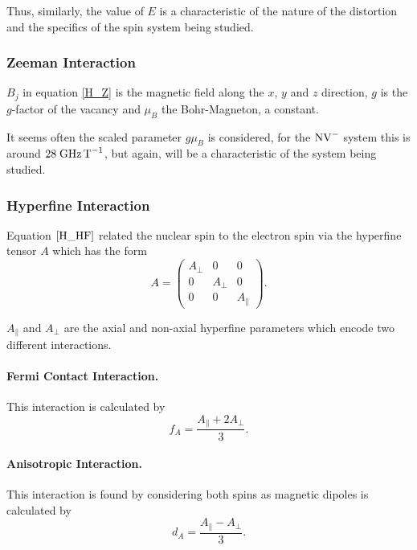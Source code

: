 Thus, similarly, the value of $E$ is a characteristic of the nature of the distortion and 
the specifics of the spin system being studied. 

\subsubsection{Zeeman Interaction}

$B_j$ in equation \ref{H_Z} is the magnetic field along the $x$, $y$ and $z$ direction, $g$ is the $g$-factor of the vacancy and $\mu_B$ the Bohr-Magneton, a constant. 

It seems often the scaled parameter $g\mu_B$ is considered, for the $\ce{NV^-}$ system this is around $28\;\ce{ GHz T^{-1}}$, but again, will be a characteristic of the system being studied. 

\subsubsection{Hyperfine Interaction}

Equation $\ref{H_HF}$ related the nuclear spin to the electron spin via the hyperfine tensor $A$ which has the form 
\begin{equation}
    A = \begin{pmatrix}
        A_\perp & 0 & 0 \\ 
        0 & A_\perp & 0 \\ 
        0 & 0 & A_\parallel
    \end{pmatrix}.
    \label{eq:hyperfine_tensor}
\end{equation}

$A_\parallel$ and $A_\perp$ are the axial and non-axial hyperfine parameters which encode two different interactions. 

\paragraph{Fermi Contact Interaction.}
This interaction is calculated by 
\begin{equation}
    f_A = \frac{A_\parallel + 2 A_\perp}{3}.
    \label{eq:fermi_contact}
\end{equation}

\paragraph{Anisotropic Interaction.}
This interaction is found by considering both spins as magnetic dipoles is calculated by 
\begin{equation}
    d_A = \frac{A_\parallel - A_\perp}{3}.
    \label{eq:anisotropic}
\end{equation}

